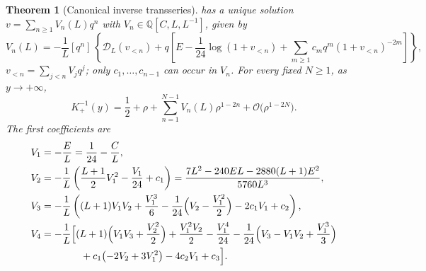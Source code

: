 \documentclass[11pt,a4paper,oneside]{book}
\theoremstyle{plain}
\newtheorem{theorem}{Theorem}[chapter]
\theoremstyle{definition}
\theoremstyle{remark}
\newcommand{\Rat}{\mathbb{Q}}
\newcommand{\Coef}[1]{[#1]\,}
\newcommand{\bigO}{\mathcal{O}}
\begin{document}
\begin{theorem}[Canonical inverse transseries]\label{p7:thm:canonical}
 has a unique solution
$v=\sum_{n\ge1}V_n(L)q^{n}$ with $V_n\in\Rat[C,L,L^{-1}]$, given by
\begin{equation}\label{p7:eq:V-recurrence}
 V_n(L)=-\frac1L\Coef{q^{n}}\left\{\mathcal{D}_L(v_{<n})
 +q\left[E-\frac1{24}\log(1+v_{<n})
 +\sum_{m\ge1}c_mq^{m}(1+v_{<n})^{-2m}\right]\right\},
\end{equation}
$v_{<n}=\sum_{j<n}V_jq^{j}$; only $c_1,\dots,c_{n-1}$ can occur in $V_n$.
For every fixed $N\ge1$, as $y\to+\infty$,
\begin{equation}\label{p7:eq:canonical-main}
 K_+^{-1}(y)=\frac12+\rho+\sum_{n=1}^{N-1}V_n(L)\rho^{1-2n}
 +\bigO\bigl(\rho^{1-2N}\bigr).
\end{equation}
The first coefficients are
\begin{align}
 V_1&=-\frac EL=\frac1{24}-\frac CL,\label{p7:eq:V1}\\
 V_2&=-\frac1L\left(\frac{L+1}2V_1^{2}-\frac{V_1}{24}+c_1\right)
      =\frac{7L^{2}-240EL-2880(L+1)E^{2}}{5760L^{3}},\label{p7:eq:V2}\\
 V_3&=-\frac1L\left((L+1)V_1V_2+\frac{V_1^{3}}6
      -\frac1{24}\Bigl(V_2-\frac{V_1^{2}}2\Bigr)-2c_1V_1+c_2\right),
      \label{p7:eq:V3}\\
 V_4&=-\frac1L\Bigl[(L+1)\Bigl(V_1V_3+\frac{V_2^{2}}2\Bigr)
      +\frac{V_1^{2}V_2}2-\frac{V_1^{4}}{24}
      -\frac1{24}\Bigl(V_3-V_1V_2+\frac{V_1^{3}}3\Bigr)\notag\\
 &\hspace{4em}+c_1\bigl(-2V_2+3V_1^{2}\bigr)-4c_2V_1+c_3\Bigr].
      \label{p7:eq:V4}
\end{align}
\end{theorem}
\end{document}
